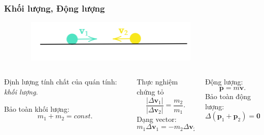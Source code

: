 \begin{frame}
    \frametitle{Khối lượng, Động lượng}
    \begin{figure}
        \centering
        \includegraphics[width=9cm, height=2cm]{Slides/Figure/colision2.png}
    \end{figure}
    \begin{columns}
        \begin{column}{0.3\textwidth}
           Định lượng tính chất của quán tính: \emph{khối lượng}.\newline

            Bảo toàn khối lượng:\[m_1 +m_2 =const.\]
        \end{column}
        \begin{column}{0.3\textwidth}
            Thực nghiệm chứng tỏ \[\frac{\lvert \Delta \mathbf{v}_1 \rvert}{\lvert\Delta\mathbf{v}_2\rvert}=\frac{m_2}{m_1}.\]
            Dạng vector: \[m_1\Delta\mathbf{v}_1 =-m_2\Delta\mathbf{v}_2.\]
        \end{column}
        \begin{column}{0.3\textwidth}
            Động lượng: \[\mathbf{p}=m\mathbf{v}.\]
            Bảo toàn động lượng:
            \[\Delta(\mathbf{p}_1+\mathbf{p}_2)=\mathbf{0}.\]
        \end{column}
    \end{columns}
\end{frame}

